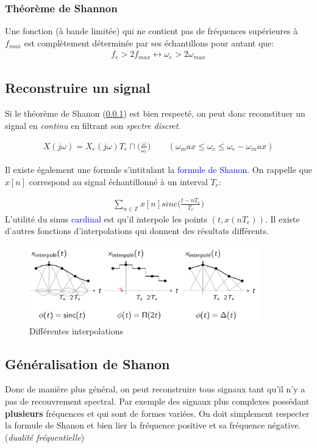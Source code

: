 \documentclass{report}
\begin{document}
\subsubsection{Théorème de Shannon} \label{Sha}
Une fonction (à bande limitée) qui ne contient pas de fréquences supérieures à $f_{max}$ est complètement déterminée par ses échantillons pour autant que:
\begin{align*}
f_e > 2 f_{max} \longleftrightarrow \omega_e > 2 \omega_{max}
\end{align*}	

\subsection{Reconstruire un signal}
Si le théorème de Shanon (\ref{Sha}) est bien respecté, on peut donc reconstituer un signal en \textit{continu} en filtrant son \textit{spectre discret}.

\begin{align*}
X(j\omega) = X_e(j\omega) T_e \sqcap \Bigr( \frac{\omega}{\omega_c} \Bigr) \qquad (\omega_max \leq \omega_c \leq \omega_e - \omega_max)
\end{align*}

Il existe également une formule s'intitulant la \textcolor{blue}{formule de Shanon}. On rappelle que $x[n]$ correspond au signal échantillonné à un interval $T_e$:

\begin{align*}
\sum_{n \in \mathbb{Z}} x[n] sinc\Bigr( \frac{t-nT_e}{T_e} \Bigr)
\end{align*}
L'utilité du sinus \textcolor{blue}{cardinal} est qu'il interpole les points $(t, x(nT_e))$. Il existe d'autres fonctions d'interpolations qui donnent des résultats différents.
\begin{figure}[H]
\centering
\includegraphics[width=10cm]{img/int.png}
\caption{Différentes interpolations}
\end{figure}

\subsection{Généralisation de Shanon}
Donc de manière plus général, on peut reconstruire tous signaux tant qu'il n'y a pas de recouvrement spectral. Par exemple des signaux plus complexes possédant \textbf{plusieurs} fréquences et qui sont de formes variées. On doit simplement respecter la formule de Shanon et bien lier la fréquence positive et sa fréquence négative. (\textit{dualité fréquentielle})
\end{document}
